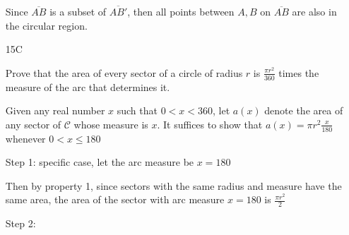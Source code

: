 \documentclass[11pt]{article}
\newcommand{\segment}[1]{\overline{#1}}
\begin{document}
\begin{itemize}
		Since $\segment{AB}$ is a subset of $\segment{AB'}$, then all points between $A,B$ on $\segment{AB}$ are also in the circular region.

	\item[15C]
	
		Prove that the area of every sector of a circle of radius $r$ is $\frac{\pi r^2}{360}$ times the measure of the arc that determines it.

		Given any real number $x$ such that $0 < x < 360$, let $a(x)$ denote the area of any sector of $\mathscr{C}$ whose measure is $x$. It suffices to show that $a(x) = \pi r^2 \frac{x}{180}$ whenever $ 0 < x \leq 180$

		Step 1: specific case, let the arc measure be $x = 180$

		Then by property 1, since sectors with the same radius and measure have the same area, the area of the sector with arc measure $x = 180$ is $\frac{\pi r^2 }{2}$

		Step 2: 


\end{itemize}
\end{document}

